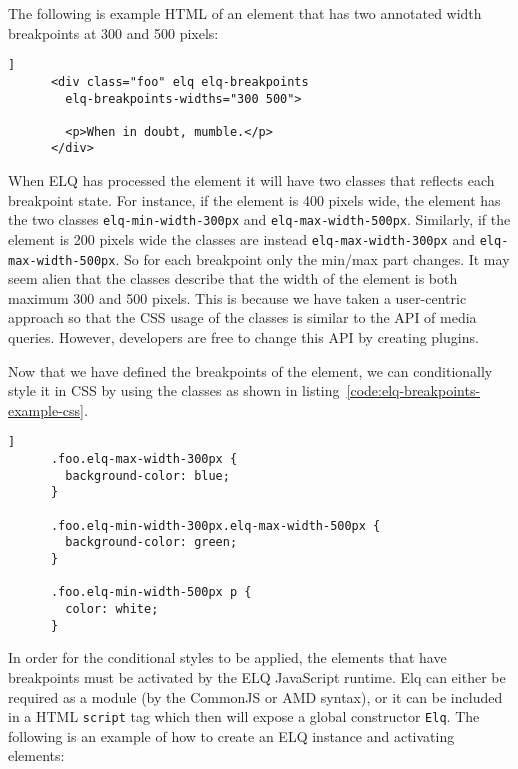 \documentclass{acm_proc_article-sp}
\newcommand{\code}[1]{\texttt{#1}}
\newcommand{\elq}{ELQ}
\begin{document}
    The following is example HTML of an element that has two annotated width breakpoints at 300 and 500 pixels:

    \begin{lstlisting}[gobble=6,caption={},captionpos=b,label={}]]
      <div class="foo" elq elq-breakpoints
        elq-breakpoints-widths="300 500">
        
        <p>When in doubt, mumble.</p>
      </div>
    \end{lstlisting}

    When \elq{} has processed the element it will have two classes that reflects each breakpoint state.
    For instance, if the element is 400 pixels wide, the element has the two classes \code{elq-min-width-300px} and \code{elq-max-width-500px}.
    Similarly, if the element is 200 pixels wide the classes are instead \code{elq-max-width-300px} and \code{elq-max-width-500px}.
    So for each breakpoint only the min/max part changes.
    It may seem alien that the classes describe that the width of the element is both maximum 300 and 500 pixels.
    This is because we have taken a user-centric approach so that the CSS usage of the classes is similar to the API of media queries.
    However, developers are free to change this API by creating plugins.

    Now that we have defined the breakpoints of the element, we can conditionally style it in CSS by using the classes as shown in listing~\ref{code:elq-breakpoints-example-css}.

    \begin{lstlisting}[gobble=6,caption={Example usage of the breakpoint state classes in CSS.},captionpos=b,label={code:elq-breakpoints-example-css}]]
      .foo.elq-max-width-300px {
        background-color: blue;
      }

      .foo.elq-min-width-300px.elq-max-width-500px {
        background-color: green;
      }

      .foo.elq-min-width-500px p {
        color: white;
      }
    \end{lstlisting}

    In order for the conditional styles to be applied, the elements that have breakpoints must be activated by the \elq{} JavaScript runtime.
    Elq can either be required as a module (by the CommonJS or AMD syntax), or it can be included in a HTML \code{script} tag which then will expose a global constructor \code{Elq}.
    The following is an example of how to create an \elq{} instance and activating elements:
\end{document}
